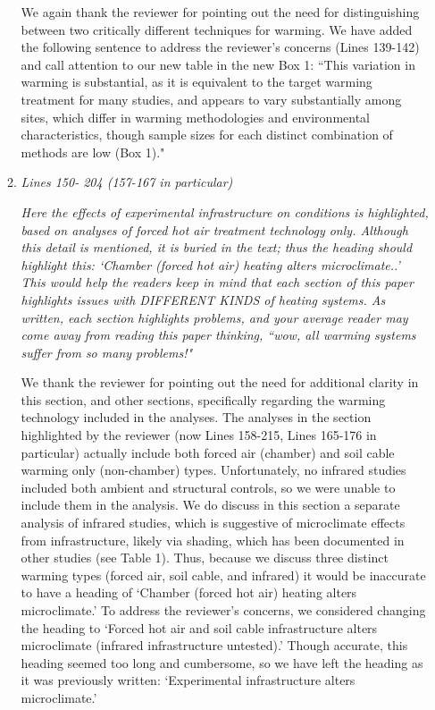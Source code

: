 \documentclass[11pt,a4paper]{letter}
\begin{document}
\begin{letter}{}
\begin{enumerate}
\begin{enumerate}
\par We again thank the reviewer for pointing out the need for distinguishing between two critically different techniques for warming. We have added the following sentence to address the reviewer's concerns (Lines 139-142) and call attention to our new table in the new Box 1: ``This variation in warming is substantial, as it is equivalent to the target warming treatment for many studies, and appears to vary substantially among sites, which differ in warming methodologies and environmental characteristics, though sample sizes for each distinct combination of methods are low (Box 1)." 

\item  \emph{ Lines 150- 204 (157-167 in particular)}
\par \emph{Here the effects of experimental infrastructure on conditions is highlighted,
based on analyses of forced hot air treatment technology only. Although this
detail is mentioned, it is buried in the text; thus the heading should highlight
this: `Chamber (forced hot air) heating alters microclimate..' This would help
the readers keep in mind that each section of this paper highlights issues with
DIFFERENT KINDS of heating systems. As written, each section highlights
problems, and your average reader may come away from reading this paper
thinking, ``wow, all warming systems suffer from so many problems!"}
\par We thank the reviewer for pointing out the need for additional clarity in this section, and other sections, specifically regarding the warming technology included in the analyses. The analyses in the section highlighted by the reviewer (now Lines 158-215, Lines 165-176 in particular) actually include both forced air (chamber) and soil cable warming only (non-chamber) types. Unfortunately, no infrared studies included both ambient and structural controls, so we were unable to include them in the analysis. We do discuss in this section a separate analysis of infrared studies, which is suggestive of microclimate effects from infrastructure, likely via shading, which has been documented in other studies (see Table 1). Thus, because we discuss three distinct warming types (forced air, soil cable, and infrared) it would be inaccurate to have a heading of `Chamber (forced hot air) heating alters microclimate.' To address the reviewer's concerns, we considered changing the heading to `Forced hot air and soil cable infrastructure alters microclimate (infrared infrastructure untested).' Though accurate, this heading seemed too long and cumbersome, so we have left the heading as it was previously written: `Experimental infrastructure alters microclimate.'


\end{enumerate}
\end{enumerate}
\end{letter}
\end{document}
